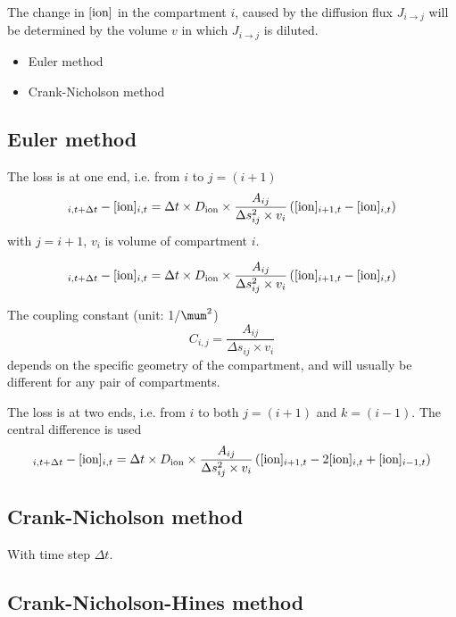 The change in $[{\text{ion}}]$ in the compartment $i$, caused by the diffusion flux
$J_{i\rightarrow j}$ will be determined by the volume $v$ in which 
$J_{i \rightarrow j}$ is diluted.
\begin{itemize}
  \item Euler method
  \item Crank-Nicholson method
\end{itemize}

\subsection{Euler method}
\label{sec:Euler-method-ion-diffusion}

The loss is at one end, i.e. from $i$ to $j=(i+1)$
\begin{equation}
[\ion]_{i,t+\Delta t} - [\ion]_{i,t} = \Delta t \times D_\ion \times
\frac{A_{ij}}{\Delta s_{ij}^2 \times v_i} \left(
[\ion]_{i+1,t} - [\ion]_{i,t}\right)
\end{equation}
with $j=i+1$, $v_i$ is volume of compartment $i$.

\begin{equation}
[\ion]_{i,t+\Delta t} - [\ion]_{i,t} = \Delta t \times D_\ion \times
\frac{A_{ij}}{\Delta s_{ij}^2 \times v_i} \left(
[\ion]_{i+1,t} - [\ion]_{i,t}\right)
\end{equation}

The coupling constant (unit: 1/$\mum^2$)
\begin{equation}
C_{i,j} = \frac{A_{ij}}{\Delta s_{ij} \times v_i} 
\end{equation}
depends on the specific geometry of the compartment, and will usually be
different for any pair of compartments.

The loss is at two ends, i.e. from $i$ to both $j=(i+1)$ and $k=(i-1)$.
The central difference is used
\begin{equation}
[\ion]_{i,t+\Delta t} - [\ion]_{i,t} = \Delta t \times D_\ion \times
\frac{A_{ij}}{\Delta s_{ij}^2 \times v_i} \left(
[\ion]_{i+1,t} - 2[\ion]_{i,t} + [\ion]_{i-1,t}\right)
\end{equation}

\subsection{Crank-Nicholson method}
\label{sec:Crank-Nicholson-method-ion-diffusion}

With time step $\Delta t$.

\subsection{Crank-Nicholson-Hines method}
\label{sec:Crank-Nicholson-Hines-method-ion-diffusion}

